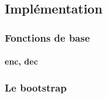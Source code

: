 \subsection{Implémentation}

\begin{frame}
\frametitle{Fonctions de base}
\framesubtitle{enc, dec}
\end{frame}



\begin{frame}
\frametitle{Le bootstrap}
\end{frame}